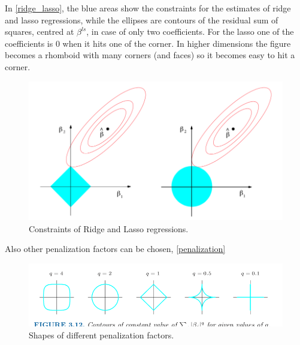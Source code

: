 In \autoref{ridge_lasso}, the blue areas show the constraints for the estimates of ridge and lasso regressions, while the ellipses are contours of the residual sum of squares, centred at $\beta^{ls}$, in case of only two coefficients. For the lasso one of the coefficients is $0$ when it hits one of the corner. In higher dimensions the figure becomes a rhomboid with many corners (and faces) so it becomes easy to hit a corner. 
\begin{figure}
\centering
\includegraphics[scale=0.4]{img/ridge_lasso}
\caption{Constraints of Ridge and Lasso regressions.}
\label{ridge_lasso}
\end{figure}

Also other penalization factors can be chosen, \autoref{penalization}

\begin{figure}
\centering
\includegraphics[scale=0.4]{img/penalization}
\caption{Shapes of different penalization factors.}
\label{penalization}
\end{figure}


